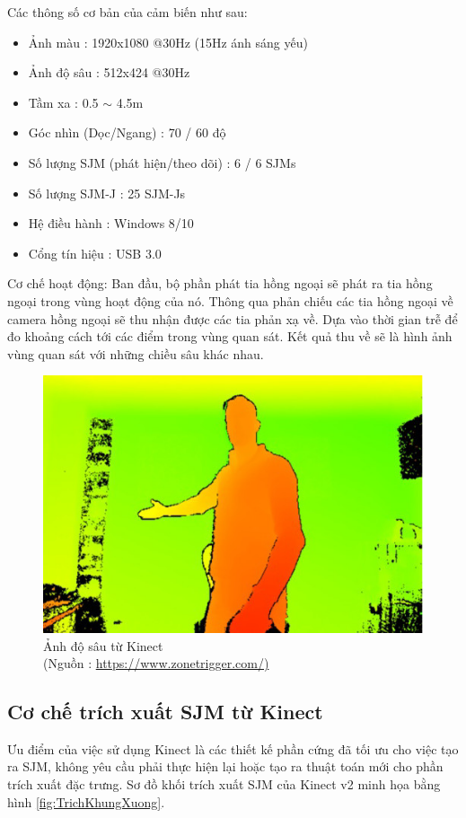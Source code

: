 Các thông số cơ bản của cảm biến như sau:
\begin{itemize}
\item Ảnh màu : 1920x1080 @30Hz (15Hz ánh sáng yếu)
\item Ảnh độ sâu : 512x424 @30Hz
\item Tầm xa : 0.5 $\sim$ 4.5m
\item Góc nhìn (Dọc/Ngang) : 70 / 60 độ
\item Số lượng SJM (phát hiện/theo dõi) : 6 / 6 SJMs
\item Số lượng SJM-J : 25 SJM-Js
\item Hệ điều hành : Windows 8/10
\item Cổng tín hiệu : USB 3.0
\end{itemize}

Cơ chế hoạt động: Ban đầu, bộ phần phát tia hồng ngoại sẽ phát ra tia hồng ngoại trong vùng hoạt động của nó. Thông qua phản chiếu các tia hồng ngoại về camera hồng ngoại sẽ thu nhận được các tia phản xạ về. Dựa vào thời gian trễ để đo khoảng cách tới các điểm trong vùng quan sát. Kết quả thu về sẽ là hình ảnh vùng quan sát với những chiều sâu khác nhau.

\FloatBarrier
\begin{figure}[htp]
\begin{center}
\includegraphics[scale=0.8]{chap3/c3_figs/depth.jpg}
\end{center}
\caption{Ảnh độ sâu từ Kinect \\(Nguồn : \url{https://www.zonetrigger.com/)}}
\label{fig:kinect}
\end{figure}
\FloatBarrier

\subsection{Cơ chế trích xuất SJM từ Kinect}
Ưu điểm của việc sử dụng Kinect là các thiết kế phần cứng đã tối ưu cho việc tạo ra SJM, không yêu cầu phải thực hiện lại hoặc tạo ra thuật toán mới cho phần trích xuất đặc trưng. Sơ đồ khối trích xuất SJM của Kinect v2 minh họa bằng hình \ref{fig:TrichKhungXuong}.

